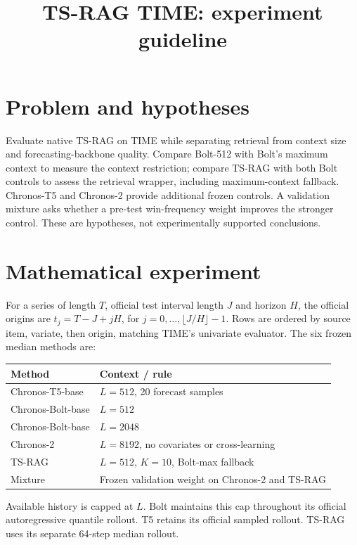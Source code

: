 \documentclass[11pt,a4paper]{article}
\title{TS-RAG TIME: experiment guideline}
\author{}\date{}
\begin{document}
\maketitle
\section{Problem and hypotheses}
Evaluate native TS-RAG on TIME while separating retrieval from context size
and forecasting-backbone quality. Compare Bolt-512 with Bolt's maximum
context to measure the context restriction; compare TS-RAG with both Bolt
controls to assess the retrieval wrapper, including maximum-context fallback. Chronos-T5
and Chronos-2 provide additional frozen controls. A validation mixture asks
whether a pre-test win-frequency weight improves the stronger control.
These are hypotheses, not experimentally supported conclusions.

\section{Mathematical experiment}
For a series of length $T$, official test interval length $J$ and horizon $H$,
the official origins are $t_j=T-J+jH$, for $j=0,\ldots,\lfloor J/H\rfloor-1$.
Rows are ordered by source item, variate, then origin, matching TIME's
univariate evaluator. The six frozen median methods are:
\begin{center}
\begin{tabular}{ll}\toprule
Method & Context / rule\\\midrule
Chronos-T5-base & $L=512$, 20 forecast samples\\
Chronos-Bolt-base & $L=512$\\
Chronos-Bolt-base & $L=2048$\\
Chronos-2 & $L=8192$, no covariates or cross-learning\\
TS-RAG & $L=512$, $K=10$, Bolt-max fallback\\
Mixture & Frozen validation weight on Chronos-2 and TS-RAG\\\bottomrule
\end{tabular}
\end{center}
Available history is capped at $L$. Bolt maintains this cap throughout its
official autoregressive quantile rollout. T5 retains its official sampled
rollout. TS-RAG uses its separate 64-step median rollout.
\end{document}

